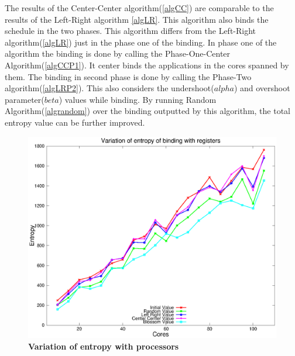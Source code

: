 \documentclass[10pt, conference]{IEEEtran}
\begin{document}
The results of the Center-Center algorithm(\ref{algCC}) are comparable to the results of the Left-Right algorithm \ref{algLR}. This algorithm also binds the schedule in the two phases. This algorithm differs from the Left-Right algorithm(\ref{algLR}) just in the phase one of the binding. In phase one of the algorithm the binding is done by calling the Phase-One-Center Algorithm(\ref{algCCP1}). It center binds the applications in the cores spanned by them. The binding in second phase is done by calling the Phase-Two algorithm(\ref{algLRP2}). This also considers the undershoot($alpha$) and overshoot parameter($beta$) values while binding. By running Random Algorithm(\ref{algrandom}) over the binding outputted by this algorithm, the total entropy value can be further improved.  \ \\
 
\begin{figure} [tb]
\centering
\includegraphics[scale=0.45]{figure/data1.eps}
\caption{\textbf{Variation of entropy with processors}}
\label{EntropyVsProc}
\end{figure}
\end{document}
